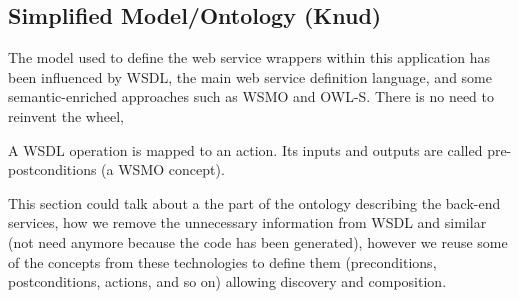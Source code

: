 
\subsection{Simplified Model/Ontology (Knud)}
\label{ssec:ontology}
The model used to define the web service wrappers within this application has been influenced by WSDL, the main web service definition language, and some semantic-enriched approaches such as WSMO and OWL-S. There is no need to reinvent the wheel, 

A WSDL operation is mapped to an action. Its inputs and outputs are called pre-postconditions (a WSMO concept). 

This section could talk about a the part of the ontology describing the back-end services, how we remove the unnecessary information from WSDL and similar (not need anymore because the code has been generated), however we reuse some of the concepts from these technologies to define them (preconditions, postconditions, actions, and so on) allowing discovery and composition.


